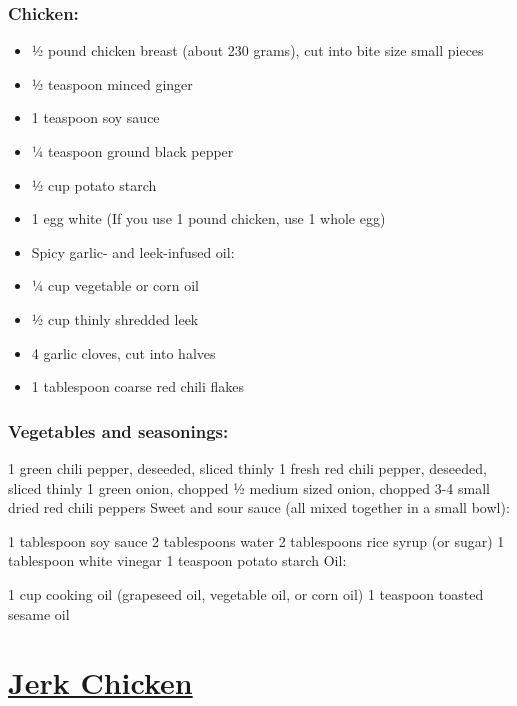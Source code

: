 \documentclass[]{article}
\begin{document}
\hypertarget{chicken}{%
\subsubsection{Chicken:}\label{chicken}}

\begin{itemize}
\item
  ½ pound chicken breast (about 230 grams), cut into bite size small pieces
\item
  ½ teaspoon minced ginger
\item
  1 teaspoon soy sauce
\item
  ¼ teaspoon ground black pepper
\item
  ½ cup potato starch
\item
  1 egg white (If you use 1 pound chicken, use 1 whole egg)
\item
  Spicy garlic- and leek-infused oil:
\item
  ¼ cup vegetable or corn oil
\item
  ½ cup thinly shredded leek
\item
  4 garlic cloves, cut into halves
\item
  1 tablespoon coarse red chili flakes
\end{itemize}

\hypertarget{vegetables-and-seasonings}{%
\subsubsection{Vegetables and seasonings:}\label{vegetables-and-seasonings}}

1 green chili pepper, deseeded, sliced thinly
1 fresh red chili pepper, deseeded, sliced thinly
1 green onion, chopped
½ medium sized onion, chopped
3-4 small dried red chili peppers
Sweet and sour sauce (all mixed together in a small bowl):

1 tablespoon soy sauce
2 tablespoons water
2 tablespoons rice syrup (or sugar)
1 tablespoon white vinegar
1 teaspoon potato starch
Oil:

1 cup cooking oil (grapeseed oil, vegetable oil, or corn oil)
1 teaspoon toasted sesame oil

\hypertarget{jerk-chicken}{%
\section{\texorpdfstring{\href{https://www.seriouseats.com/recipes/2013/08/jerk-chicken.html}{Jerk Chicken}}{Jerk Chicken}}\label{jerk-chicken}}
\end{document}
